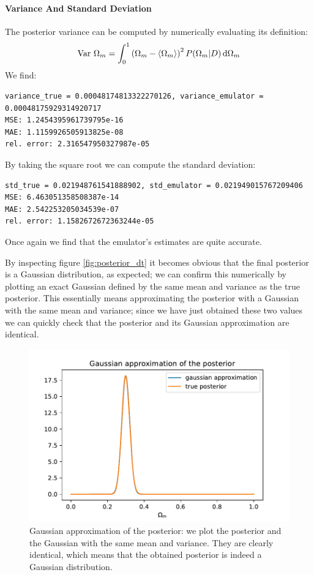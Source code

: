 \paragraph{Variance And Standard Deviation}
The posterior variance can be computed by numerically evaluating its definition:
\begin{equation*}
    \mathrm{Var} \ {\Omega_m} = \int_0^1 \left(\Omega_m - \expval{\Omega_m}\right)^2 P(\Omega_m|D) \dd{\Omega_m}
\end{equation*}
We find:
\begin{verbatim}
variance_true = 0.00048174813322270126, variance_emulator = 0.00048175929314920717
MSE: 1.2454395961739795e-16
MAE: 1.1159926505913825e-08
rel. error: 2.316547950327987e-05
\end{verbatim}
By taking the square root we can compute the standard deviation:
\begin{verbatim}
std_true = 0.021948761541888902, std_emulator = 0.021949015767209406
MSE: 6.463051358508387e-14
MAE: 2.542253205034539e-07
rel. error: 1.1582672672363244e-05
\end{verbatim}
Once again we find that the emulator's estimates are quite accurate.

By inspecting figure \ref{fig:posterior_dt} it becomes obvious that the final posterior is a Gaussian distribution, as expected; we can confirm this numerically by plotting an exact Gaussian defined by the same mean and variance as the true posterior. This essentially means approximating the posterior with a Gaussian with the same mean and variance; since we have just obtained these two values we can quickly check that the posterior and its Gaussian approximation are identical.
\begin{figure}[H]
    \centering
    \includegraphics[width=\textwidth]{img/gaussian_approx.pdf}
    \caption{Gaussian approximation of the posterior: we plot the posterior and the Gaussian with the same mean and variance. They are clearly identical, which means that the obtained posterior is indeed a Gaussian distribution.}
\end{figure}

